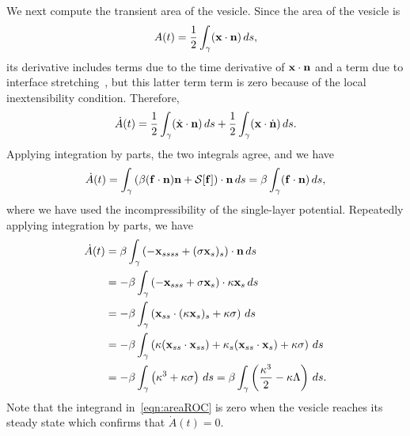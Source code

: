 \documentclass[9pt,twocolumn,twoside,lineno]{pnas-new}
\begin{document}
We next compute the transient area of the vesicle. Since the area of the
vesicle is
\begin{align}
  A(t) = \frac{1}{2}\int_{\gamma} (\mathbf{x} \cdot \mathbf{n})\, ds,
  \label{eqn:area}
\end{align}
its derivative includes terms due to the time derivative of $\mathbf{x} \cdot
\mathbf{n}$ and a term due to interface stretching~\cite{lai-tse-hua2008}, but
this latter term term is zero because of the local inextensibility
condition. Therefore,
\begin{align}
  \dot{A}(t) =
  \frac{1}{2} \int_{\gamma} (\dot{\mathbf{x}} \cdot \mathbf{n})\, ds  + 
  \frac{1}{2} \int_{\gamma} (\mathbf{x} \cdot \dot{\mathbf{n}})\, ds.
\end{align}
Applying integration by parts, the two integrals agree, and we have
\begin{align}
  \dot{A}(t) = \int_\gamma \left(\beta (\mathbf{f} \cdot \mathbf{n})\mathbf{n} 
    + \mathcal{S}[\mathbf{f}]\right) \cdot \mathbf{n}\, ds 
  = \beta \int_\gamma (\mathbf{f} \cdot \mathbf{n})\, ds,
\end{align}
where we have used the incompressibility of the single-layer potential.
Repeatedly applying integration by parts, we have
\begin{align}
  \dot{A}(t) &= \beta \int_\gamma \left( -\mathbf{x}_{ssss} + 
    (\sigma \mathbf{x}_s)_s \right) \cdot \mathbf{n} \, ds \\
  &= -\beta \int_\gamma \left(-\mathbf{x}_{sss} + \sigma \mathbf{x}_s 
    \right) \cdot \kappa \mathbf{x}_s \, ds \\
  &= -\beta \int_\gamma \left(\mathbf{x}_{ss} \cdot 
    (\kappa \mathbf{x}_s)_s + \kappa \sigma \right) \, ds \\
  &= -\beta \int_\gamma \left(\kappa (\mathbf{x}_{ss} \cdot \mathbf{x}_{ss}) + 
    \kappa_s (\mathbf{x}_{ss} \cdot \mathbf{x}_s) + \kappa \sigma \right) 
    \, ds \\
  &= -\beta \int_\gamma \left(\kappa^3 + \kappa \sigma \right) 
    \, ds = \beta \int_\gamma \left(
    \frac{\kappa^3}{2} - \kappa \Lambda \right) \, ds.
  \label{eqn:areaROC}
\end{align}
Note that the integrand in~\eqref{eqn:areaROC} is zero when the vesicle
reaches its steady state which confirms that $\dot{A}(t) = 0$.
\end{document}
